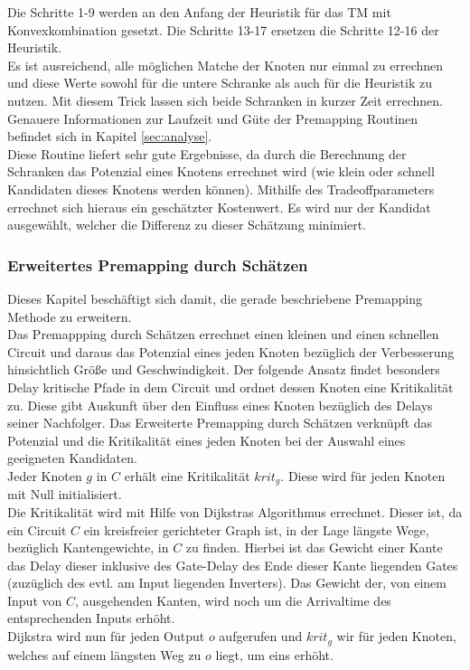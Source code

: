 \documentclass[11pt, a4paper, german]{article}
\begin{document}
Die Schritte 1-9 werden an den Anfang der Heuristik für das TM mit Konvexkombination gesetzt. Die Schritte 13-17 ersetzen die Schritte 12-16 der Heuristik.\\ 
Es ist ausreichend, alle möglichen Matche der Knoten nur einmal zu errechnen und diese Werte sowohl für die untere Schranke als auch für die Heuristik zu nutzen. Mit diesem Trick lassen sich beide Schranken in kurzer Zeit errechnen. Genauere Informationen zur Laufzeit und Güte der Premapping Routinen befindet sich in Kapitel \ref{sec:analyse}.\\
Diese Routine liefert sehr gute Ergebnisse, da durch die Berechnung der Schranken das Potenzial eines Knotens errechnet wird (wie klein oder schnell Kandidaten dieses Knotens werden können). Mithilfe des Tradeoffparameters errechnet sich hieraus ein geschätzter Kostenwert. Es wird nur der Kandidat ausgewählt, welcher die Differenz zu dieser Schätzung minimiert.

\subsubsection{Erweitertes Premapping durch Schätzen}
\label{subsec:erweitertes_premapping_durch_schaetzen}
Dieses Kapitel beschäftigt sich damit, die gerade beschriebene Premapping Methode zu erweitern. \\
Das Premappping durch Schätzen errechnet einen kleinen und einen schnellen Circuit und daraus das Potenzial eines jeden Knoten bezüglich der Verbesserung hinsichtlich Größe und Geschwindigkeit. Der folgende Ansatz findet besonders Delay kritische Pfade in dem Circuit und ordnet dessen Knoten eine Kritikalität zu. Diese gibt Auskunft über den Einfluss eines Knoten bezüglich des Delays seiner Nachfolger. Das Erweiterte Premapping durch Schätzen verknüpft das Potenzial und die Kritikalität eines jeden Knoten bei der Auswahl eines geeigneten Kandidaten. \\

Jeder Knoten $g$ in $C$ erhält eine Kritikalität $krit_g$. Diese wird für jeden Knoten mit Null initialisiert. \\
Die Kritikalität wird mit Hilfe von Dijkstras Algorithmus errechnet. Dieser ist, da ein Circuit $C$ ein kreisfreier gerichteter Graph ist, in der Lage längste Wege, bezüglich Kantengewichte,  in $C$ zu finden. Hierbei ist das Gewicht einer Kante das Delay dieser inklusive des Gate-Delay des Ende dieser Kante liegenden Gates (zuzüglich des evtl. am Input liegenden Inverters). Das Gewicht der, von einem Input von $C$, ausgehenden Kanten, wird noch um die Arrivaltime des entsprechenden Inputs erhöht. \\
Dijkstra wird nun für jeden Output $o$ aufgerufen und $krit_g$ wir für jeden Knoten, welches auf einem längsten Weg zu $o$ liegt, um eins erhöht.\\
\end{document}
